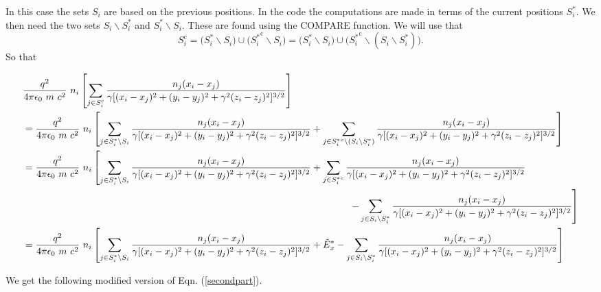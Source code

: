 \documentclass[oneside,12pt]{book}
\begin{document}
In this case the sets $S_i$ are based on the previous positions.  In the code the computations are made in terms of the current positions $S_i^*$.  We then need the two sets $S_i \backslash S_i^*$ and $S_i^* \backslash S_i$.  These are found using the COMPARE function.  We will use that 
\[S_i^\text{c}=\big(S_i^* \backslash S_i \big) \cup \big({S_i^*}^\text{c} \backslash S_i\big)=\big(S_i^* \backslash S_i \big) \cup \big({S_i^*}^\text{c} \backslash (S_i \backslash S_i^*)\big).\]
So that
\begin{scriptsize}
\begin{align*}
&\dfrac{q^2}{4 \pi \epsilon_0 \ m \ c^2} \ n_i\left[
\mathop{\sum}_{j \in S_i^\text{c}}
 \dfrac{n_j (x_i-x_j)}{\gamma[(x_i-x_j)^2+(y_i-y_j)^2+\gamma^2(z_i-z_j)^2]^{3 \slash 2}}\right] \\
 &=\dfrac{q^2}{4 \pi \epsilon_0 \ m \ c^2} \ n_i\left[
\mathop{\sum}_{j \in S_i^* \backslash S_i}
 \dfrac{n_j (x_i-x_j)}{\gamma[(x_i-x_j)^2+(y_i-y_j)^2+\gamma^2(z_i-z_j)^2]^{3 \slash 2}} +
\mathop{\sum}_{j \in {S_i^*}^\text{c} \backslash (S_i \backslash S_i^*)}
 \dfrac{n_j (x_i-x_j)}{\gamma[(x_i-x_j)^2+(y_i-y_j)^2+\gamma^2(z_i-z_j)^2]^{3 \slash 2}} \right]\\
&=\dfrac{q^2}{4 \pi \epsilon_0 \ m \ c^2} \ n_i\left[
\mathop{\sum}_{j \in S_i^* \backslash S_i}
 \dfrac{n_j (x_i-x_j)}{\gamma[(x_i-x_j)^2+(y_i-y_j)^2+\gamma^2(z_i-z_j)^2]^{3 \slash 2}} +
\mathop{\sum}_{j \in {S_i^*}^\text{c}}
 \dfrac{n_j (x_i-x_j)}{\gamma[(x_i-x_j)^2+(y_i-y_j)^2+\gamma^2(z_i-z_j)^2]^{3 \slash 2}}\right.\\
&\left. \hspace*{79ex} -\mathop{\sum}_{j \in S_i \backslash S_i^*}
 \dfrac{n_j (x_i-x_j)}{\gamma[(x_i-x_j)^2+(y_i-y_j)^2+\gamma^2(z_i-z_j)^2]^{3 \slash 2}}\right]\\
&=\dfrac{q^2}{4 \pi \epsilon_0 \ m \ c^2} \ n_i\left[
\mathop{\sum}_{j \in S_i^* \backslash S_i}
 \dfrac{n_j (x_i-x_j)}{\gamma[(x_i-x_j)^2+(y_i-y_j)^2+\gamma^2(z_i-z_j)^2]^{3 \slash 2}} +\tilde{E}_x^*-\mathop{\sum}_{j \in S_i \backslash S_i^*}
 \dfrac{n_j (x_i-x_j)}{\gamma[(x_i-x_j)^2+(y_i-y_j)^2+\gamma^2(z_i-z_j)^2]^{3 \slash 2}}\right]
\end{align*}
\end{scriptsize}

We get the following modified version of Eqn. (\ref{secondpart}).
\end{document}

